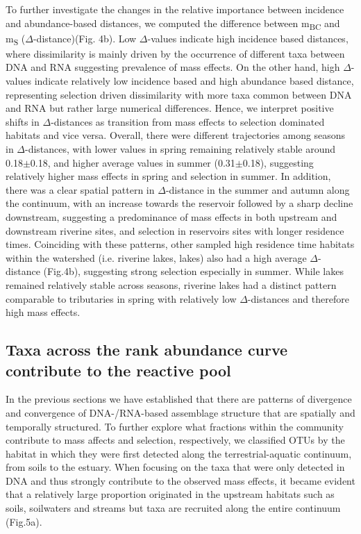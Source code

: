\documentclass[12pt,a4paper]{article} %
\begin{document}
To further investigate the changes in the relative importance between incidence and abundance-based distances, we computed the difference between m\textsubscript{BC} and m\textsubscript{S} ($\Delta$-distance)(Fig. 4b). Low $\Delta$-values indicate high incidence based distances, where dissimilarity is mainly driven by the occurrence of different taxa between DNA and RNA suggesting prevalence of mass effects. On the other hand, high $\Delta$-values indicate relatively low incidence based and high abundance based distance, representing selection driven dissimilarity with more taxa common between DNA and RNA but rather large numerical differences. Hence, we interpret positive shifts in $\Delta$-distances as transition from mass effects to selection dominated habitats and vice versa. Overall, there were different trajectories among seasons in $\Delta$-distances, with lower values in spring remaining relatively stable around 0.18$\pm$0.18, and higher average values in summer (0.31$\pm$0.18), suggesting relatively higher mass effects in spring and selection in summer. In addition, there was a clear spatial pattern in $\Delta$-distance in the summer and autumn along the continuum, with an increase towards the reservoir followed by a sharp decline downstream, suggesting a predominance of mass effects in both upstream and downstream riverine sites, and selection in reservoirs sites with longer residence times. Coinciding with these patterns, other sampled high residence time habitats within the watershed (i.e. riverine lakes, lakes) also had a high average $\Delta$-distance (Fig.4b), suggesting strong selection especially in summer. While lakes remained relatively stable across seasons, riverine lakes had a distinct pattern comparable to tributaries in spring with relatively low $\Delta$-distances and therefore high mass effects.

\subsection*{Taxa across the rank abundance curve contribute to the reactive pool}
In the previous sections we have established that there are patterns of divergence and convergence of DNA-/RNA-based assemblage structure that are spatially and temporally structured. To further explore what fractions within the community contribute to mass affects and selection, respectively, we classified OTUs by the habitat in which they were first detected along the terrestrial-aquatic continuum, from soils to the estuary. When focusing on the taxa that were only detected in DNA and thus strongly contribute to the observed mass effects, it became evident that a relatively large proportion originated in the upstream habitats such as soils, soilwaters and streams but taxa are recruited along the entire continuum (Fig.5a).
\end{document}
